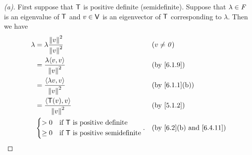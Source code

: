 \begin{proof}[(a)]
  First suppose that \(\mathsf{T}\) is positive definite (semidefinite).
  Suppose that \(\lambda \in \mathit{F}\) is an eigenvalue of \(\mathsf{T}\) and \(v \in \mathsf{V}\) is an eigenvector of \(\mathsf{T}\) corresponding to \(\lambda\).
  Then we have
  \begin{align*}
    \lambda & = \lambda \frac{\norm{v}^2}{\norm{v}^2}                    &  & (v \neq \zv)  \\
            & = \frac{\lambda \inn{v, v}}{\norm{v}^2}                    &  & \by{6.1.9}    \\
            & = \frac{\inn{\lambda v, v}}{\norm{v}^2}                    &  & \by{6.1.1}[b] \\
            & = \frac{\inn{\T(v), v}}{\norm{v}^2}                        &  & \by{5.1.2}    \\
            & \begin{dcases}
                > 0    & \text{if } \T \text{ is positive definite}     \\
                \geq 0 & \text{if } \T \text{ is positive semidefinite}
              \end{dcases}. &  & \text{(by \cref{6.2}(b) and \cref{6.4.11})}
  \end{align*}


\end{proof}
